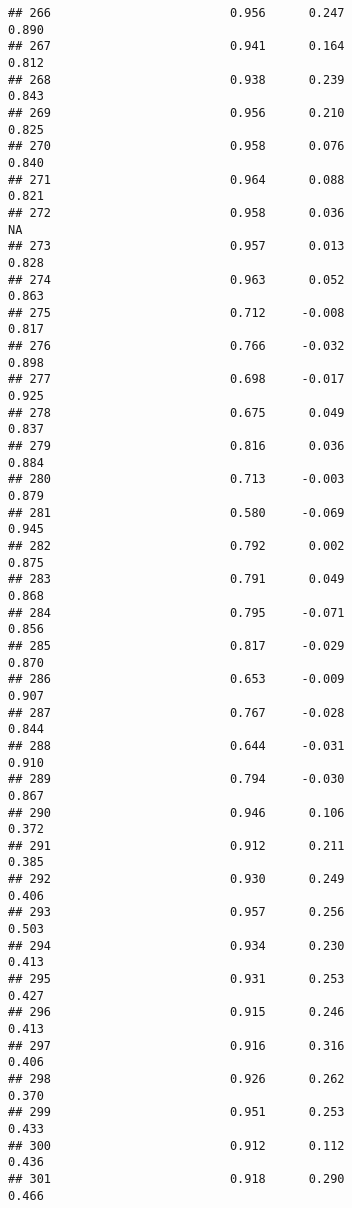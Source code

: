 \documentclass[
]{article}
\begin{document}
\begin{verbatim}
## 266                         0.956      0.247                     0.890
## 267                         0.941      0.164                     0.812
## 268                         0.938      0.239                     0.843
## 269                         0.956      0.210                     0.825
## 270                         0.958      0.076                     0.840
## 271                         0.964      0.088                     0.821
## 272                         0.958      0.036                        NA
## 273                         0.957      0.013                     0.828
## 274                         0.963      0.052                     0.863
## 275                         0.712     -0.008                     0.817
## 276                         0.766     -0.032                     0.898
## 277                         0.698     -0.017                     0.925
## 278                         0.675      0.049                     0.837
## 279                         0.816      0.036                     0.884
## 280                         0.713     -0.003                     0.879
## 281                         0.580     -0.069                     0.945
## 282                         0.792      0.002                     0.875
## 283                         0.791      0.049                     0.868
## 284                         0.795     -0.071                     0.856
## 285                         0.817     -0.029                     0.870
## 286                         0.653     -0.009                     0.907
## 287                         0.767     -0.028                     0.844
## 288                         0.644     -0.031                     0.910
## 289                         0.794     -0.030                     0.867
## 290                         0.946      0.106                     0.372
## 291                         0.912      0.211                     0.385
## 292                         0.930      0.249                     0.406
## 293                         0.957      0.256                     0.503
## 294                         0.934      0.230                     0.413
## 295                         0.931      0.253                     0.427
## 296                         0.915      0.246                     0.413
## 297                         0.916      0.316                     0.406
## 298                         0.926      0.262                     0.370
## 299                         0.951      0.253                     0.433
## 300                         0.912      0.112                     0.436
## 301                         0.918      0.290                     0.466

\end{verbatim}
\end{document}
